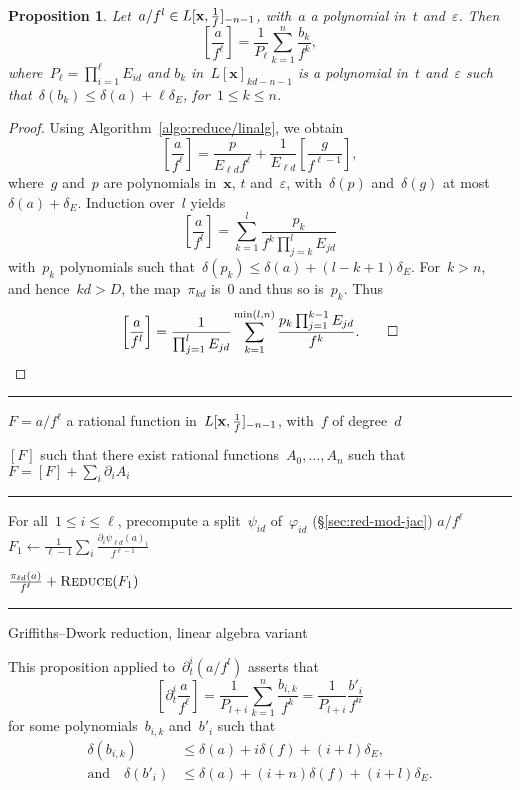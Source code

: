 \documentclass{sig-alternate}
\newtheorem{prop}[thm]{Proposition}
\newenvironment{algoenv}[3][\linewidth]{
\begin{minipage}{#1}\flushleft
\rule{\textwidth}{.08em}\vspace{-\baselineskip}\smallskip
\begin{description}[noitemsep]
\item[\rlap{Input}\phantom{Output}] #2
\item[Output] #3
\end{description}
\vspace{-\baselineskip}
\rule{\textwidth}{.05em}
\begin{algorithmic}
}{\end{algorithmic}
\vspace{-.5\baselineskip}
\rule{\textwidth}{.08em}
\end{minipage}}
\newcommand{\Reduce}{\mathop{\textsc{Reduce}}}
\newcommand{\Lx}{L[\mathbf x]}
\newcommand{\xx}{\mathbf{x}}
\newcommand{\Lxfp}{\Lxf_{\smash{-n-1}}}
\newcommand{\Lxf}{L[\xx,\smash{\tfrac{1}{f}}]}
\def\le{\leqslant}
\begin{document}
\begin{prop}\label{prop:bound-denom}
Let~$a/f^l\in\Lxfp$, with~$a$ a polynomial in~$t$ and~$\varepsilon$. Then
\[ \left[\frac{a}{f^\ell}\right] = \frac{1}{P_\ell}\sum_{k=1}^{n} \frac{b_k}{f^k}, \]
where~$P_\ell=\prod_{i=1}^\ell E_{i d}$ and $b_k$ in~$\Lx_{kd-n-1}$ is a polynomial in~$t$ and~$\varepsilon$ such that~$\delta(b_k)\leqslant \delta(a)+\ell\delta_E$, for~$1\le k\le n$.
\end{prop}

\begin{proof}
Using Algorithm~\ref{algo:reduce/linalg}, we obtain
  \[ \left[\frac{a}{f^\ell}\right] = \frac{p}{E_{\ell d} f^\ell}+\frac{1}{E_{\ell d}}\left[\frac{g}{f^{\ell-1}}\right], \]
where~$g$ and~$p$ are polynomials in~$\xx$, $t$ and~$\varepsilon$, with~$\delta(p)$ and~$\delta(g)$ at most~$\delta(a)+\delta_E$.
Induction over~$l$ yields
  \[ \left[ \frac{a}{f^l} \right]
    = \sum_{k=1}^l \frac{p_{k}}{f^{k} \prod_{j=k}^l E_{jd}}
  \]
with~$p_k$ polynomials such that~$\delta(p_k)\leqslant \delta(a)+(l-k+1)\delta_E$.
  For~$k>n$, and hence~$kd>D$, the map~$\pi_{k d}$ is~0 and thus so is~$p_{k}$.
  Thus
  \[ \left[ \frac{a}{f^l} \right] = \frac{1}{\prod_{j=1}^{l}E_{jd}} \sum_{k=1}^{\min(l,n)} \frac{p_k\prod_{j=1}^{k-1}E_{jd}}{f^k}. \qed \]
\end{proof}

\begin{algo}
\centering
\begin{algoenv}{
$F = a/f^\ell$ a rational function in~$\Lxfp$, with~$f$ of degree~$d$ }{$[F]$ such that there exist rational functions~$A_0,\dotsc,A_n$ such that $F = [F] +\sum_i\partial_i A_i$}
  \State For all~$1\leqslant i \leqslant \ell$, precompute a split~$\psi_{i d}$ of~$\varphi_{i d}$ (\S\ref{sec:red-mod-jac})
\Return $a/f^\ell$
  \EndIf
  \State $\displaystyle F_1 \gets \frac{1}{\ell-1}\sum_i\frac{\partial_i \psi_{\ell d}(a)_i}{f^{\ell-1}}$
 
  \State \Return $\frac{\pi_{\ell d}(a)}{f^\ell}+ \Reduce(F_1)$
   \EndProcedure

\end{algoenv}
\caption{Griffiths--Dwork reduction, linear algebra variant}
\label{algo:reduce/linalg}
\end{algo}

This proposition applied to~$\partial_t^i(a/f^l)$ asserts that
\begin{equation}\label{bound:deg-diff}
\left[ \partial_t^i\frac{a}{f^\ell} \right] = \frac{1}{P_{l+i}}\sum_{k=1}^n\frac{b_{i,k}}{f^k} = \frac{1}{P_{l+i}}\frac{b'_{i}}{f^n}
\end{equation}
for some polynomials~$b_{i,k}$ and~$b'_i$ such that
\begin{align}
  \label{eqn:deltabk} \delta(b_{i,k}) &\leqslant \delta(a) + i \delta(f) + (i+l)\delta_E, \\
  \label{eqn:deltabk'} \text{and}\quad\delta(b'_i) &\leqslant \delta(a) + (i+n) \delta(f) + (i+l)\delta_E.
\end{align}
\end{document}
